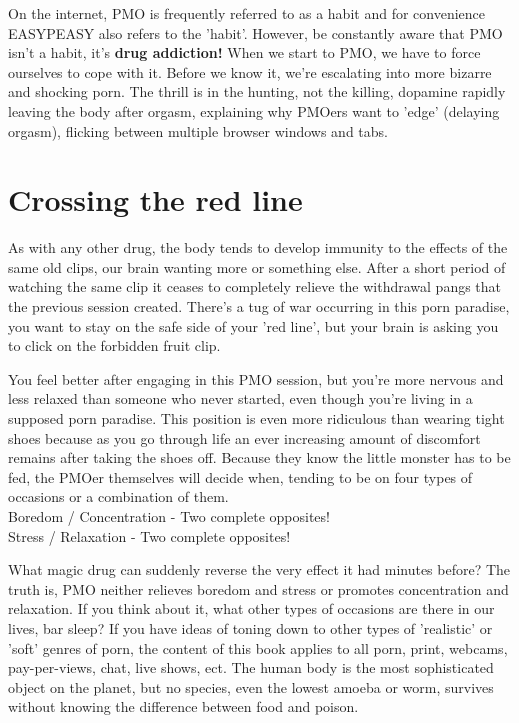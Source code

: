 \documentclass[easypeasy.tex]{subfiles}
\begin{document}
On the internet, PMO is frequently referred to as a habit and for convenience EASYPEASY also refers to the 'habit'. However, be constantly aware that PMO isn't a habit, it's \textbf{drug addiction!} When we start to PMO, we have to force ourselves to cope with it. Before we know it, we're escalating into more bizarre and shocking porn. The thrill is in the hunting, not the killing, dopamine rapidly leaving the body after orgasm, explaining why PMOers want to 'edge' (delaying orgasm), flicking between multiple browser windows and tabs.

\section{Crossing the red line}
As with any other drug, the body tends to develop immunity to the effects of the same old clips, our brain wanting more or something else. After a short period of watching the same clip it ceases to completely relieve the withdrawal pangs that the previous session created. There's a tug of war occurring in this porn paradise, you want to stay on the safe side of your 'red line', but your brain is asking you to click on the forbidden fruit clip.

You feel better after engaging in this PMO session, but you're more nervous and less relaxed than someone who never started, even though you're living in a supposed porn paradise. This position is even more ridiculous than wearing tight shoes because as you go through life an ever increasing amount of discomfort remains after taking the shoes off. Because they know the little monster has to be fed, the PMOer themselves will decide when, tending to be on four types of occasions or a combination of them.\\
  Boredom / Concentration - Two complete opposites!\\
  Stress / Relaxation - Two complete opposites!

What magic drug can suddenly reverse the very effect it had minutes before? The truth is, PMO neither relieves boredom and stress or promotes concentration and relaxation. If you think about it, what other types of occasions are there in our lives, bar sleep? If you have ideas of toning down to other types of 'realistic' or 'soft' genres of porn, the content of this book applies to all porn, print, webcams, pay-per-views, chat, live shows, ect. The human body is the most sophisticated object on the planet, but no species, even the lowest amoeba or worm, survives without knowing the difference between food and poison.
\end{document}
